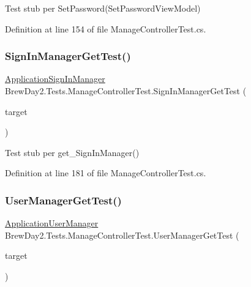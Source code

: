 Test stub per Set\+Password(\+Set\+Password\+View\+Model)



Definition at line 154 of file Manage\+Controller\+Test.\+cs.

\mbox{\label{class_brew_day2_1_1_tests_1_1_manage_controller_test_a7bf08b505c41c162c3db3ef73b0ef989}} 
\subsubsection{\texorpdfstring{Sign\+In\+Manager\+Get\+Test()}{SignInManagerGetTest()}}
{\footnotesize\ttfamily \mbox{\hyperlink{class_brew_day2_1_1_application_sign_in_manager}{Application\+Sign\+In\+Manager}} Brew\+Day2.\+Tests.\+Manage\+Controller\+Test.\+Sign\+In\+Manager\+Get\+Test (\begin{DoxyParamCaption}\item[{\mbox{[}\+Pex\+Assume\+Under\+Test\mbox{]} \mbox{\hyperlink{class_brew_day2_1_1_controllers_1_1_manage_controller}{Manage\+Controller}}}]{target }\end{DoxyParamCaption})}



Test stub per get\+\_\+\+Sign\+In\+Manager()



Definition at line 181 of file Manage\+Controller\+Test.\+cs.

\mbox{\label{class_brew_day2_1_1_tests_1_1_manage_controller_test_acbbe52e22e75da9dd698dd9cf8b2e60c}} 
\subsubsection{\texorpdfstring{User\+Manager\+Get\+Test()}{UserManagerGetTest()}}
{\footnotesize\ttfamily \mbox{\hyperlink{class_brew_day2_1_1_application_user_manager}{Application\+User\+Manager}} Brew\+Day2.\+Tests.\+Manage\+Controller\+Test.\+User\+Manager\+Get\+Test (\begin{DoxyParamCaption}\item[{\mbox{[}\+Pex\+Assume\+Under\+Test\mbox{]} \mbox{\hyperlink{class_brew_day2_1_1_controllers_1_1_manage_controller}{Manage\+Controller}}}]{target }\end{DoxyParamCaption})}



